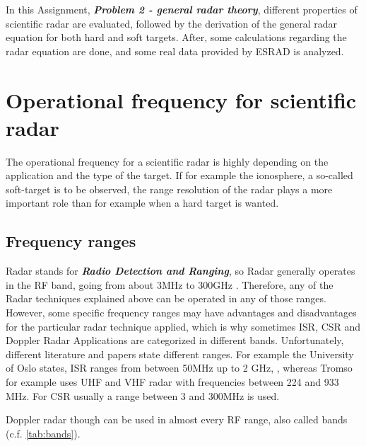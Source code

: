 

In this Assignment, \textit{\textbf{Problem 2 - general radar theory}}, different properties of scientific radar are evaluated, followed by the derivation of the general radar equation for both hard and soft targets. After, some calculations regarding the radar equation are done, and some real data provided by ESRAD is analyzed.


\section{Operational frequency for scientific radar}
The operational frequency for a scientific radar is highly depending on the application and the type of the target. If for example the ionosphere, a so-called soft-target is to be observed, the range resolution of the radar plays a more important role than for example when a hard target is wanted. 


\subsection{Frequency ranges}
Radar stands for \textit{\textbf{Radio Detection and Ranging}}, so Radar generally operates in the RF band, going from about 3MHz to 300GHz \citep{richards2010principles}. Therefore, any of the Radar techniques explained above can be operated in any of those ranges. However, some specific frequency ranges may have advantages and disadvantages for the particular radar technique applied, which is why sometimes ISR, CSR and Doppler Radar Applications are categorized in different bands. Unfortunately, different literature and papers state different ranges. For example the University of Oslo states, ISR ranges from between 50MHz up to 2 GHz, \citep{oslo:lecture}, whereas Tromso for example uses UHF and VHF radar with frequencies between 224 and 933 MHz. For CSR usually a range between 3 and 300MHz is used.

Doppler radar though can be used in almost every RF range, also called bands (c.f. \ref{tab:bands}).

